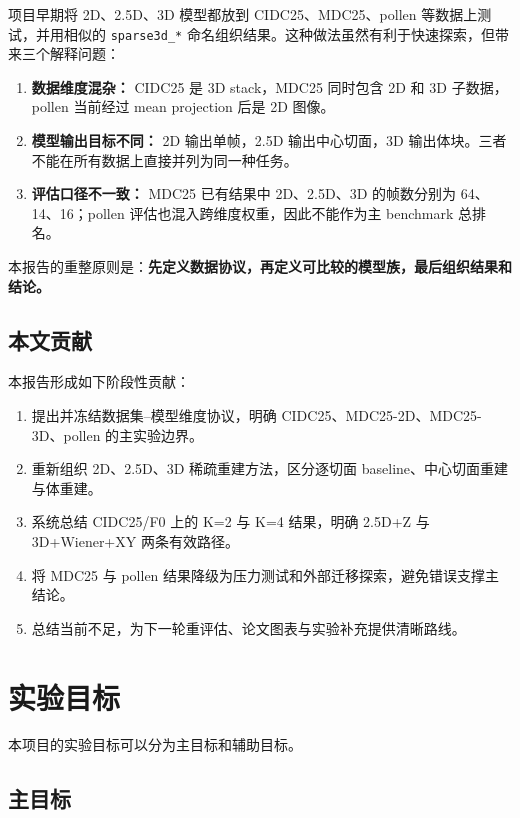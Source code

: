 \documentclass[UTF8, scheme=plain, 11pt, a4paper]{ctexart}
\begin{document}
项目早期将 2D、2.5D、3D 模型都放到 CIDC25、MDC25、pollen 等数据上测试，并用相似的 \texttt{sparse3d\_*} 命名组织结果。这种做法虽然有利于快速探索，但带来三个解释问题：

\begin{enumerate}[leftmargin=*]
  \item \textbf{数据维度混杂：} CIDC25 是 3D stack，MDC25 同时包含 2D 和 3D 子数据，pollen 当前经过 mean projection 后是 2D 图像。
  \item \textbf{模型输出目标不同：} 2D 输出单帧，2.5D 输出中心切面，3D 输出体块。三者不能在所有数据上直接并列为同一种任务。
  \item \textbf{评估口径不一致：} MDC25 已有结果中 2D、2.5D、3D 的帧数分别为 64、14、16；pollen 评估也混入跨维度权重，因此不能作为主 benchmark 总排名。
\end{enumerate}

本报告的重整原则是：\textbf{先定义数据协议，再定义可比较的模型族，最后组织结果和结论。}

\subsection{本文贡献}

本报告形成如下阶段性贡献：

\begin{enumerate}[leftmargin=*]
  \item 提出并冻结数据集--模型维度协议，明确 CIDC25、MDC25-2D、MDC25-3D、pollen 的主实验边界。
  \item 重新组织 2D、2.5D、3D 稀疏重建方法，区分逐切面 baseline、中心切面重建与体重建。
  \item 系统总结 CIDC25/F0 上的 K=2 与 K=4 结果，明确 2.5D+Z 与 3D+Wiener+XY 两条有效路径。
  \item 将 MDC25 与 pollen 结果降级为压力测试和外部迁移探索，避免错误支撑主结论。
  \item 总结当前不足，为下一轮重评估、论文图表与实验补充提供清晰路线。
\end{enumerate}

\section{实验目标}

本项目的实验目标可以分为主目标和辅助目标。

\subsection{主目标}
\end{document}

